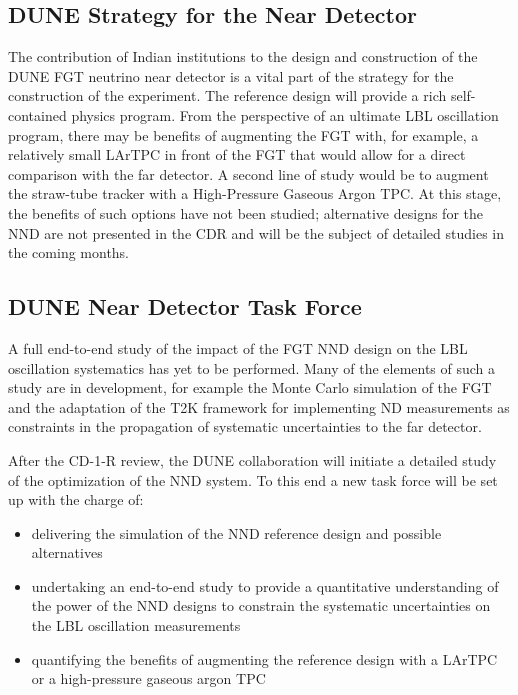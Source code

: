 \subsection{DUNE Strategy for the Near Detector}

The contribution of Indian institutions to the design and construction of the DUNE 
FGT neutrino near detector is a vital part of the strategy for the construction 
of the experiment. The reference design will provide a rich self-contained physics 
program. From the perspective of an ultimate LBL oscillation program, there may 
be benefits of augmenting the FGT with, for example, a relatively small LArTPC 
in front of the FGT that would allow for a direct comparison with the far detector. 
A second line of study would be to augment the straw-tube tracker  with 
a High-Pressure Gaseous Argon TPC. At this stage, the benefits of such options 
have not been studied; alternative designs for the NND are not presented in 
the CDR and will be the subject of detailed studies in the coming months. 

\subsection{DUNE Near Detector Task Force}

A full end-to-end study of the impact of the FGT NND design on the LBL oscillation 
systematics has yet to be performed. Many of the elements of such a study are in 
development, for example the Monte Carlo simulation of the FGT and the adaptation 
of the T2K framework for implementing ND measurements as constraints in the propagation 
of systematic uncertainties to the far detector. 

After the CD-1-R review, the DUNE collaboration will initiate a detailed study 
of the optimization of the NND system. To this end a new task force will be set 
up with the charge of:

\begin{itemize}
\item delivering the simulation of the NND reference design and possible alternatives

\item undertaking an end-to-end study to provide a quantitative understanding of 
the power of the NND designs to constrain the systematic uncertainties on the LBL 
oscillation measurements

\item quantifying the benefits of augmenting the reference design with a LArTPC 
or a high-pressure gaseous argon TPC
\end{itemize}

